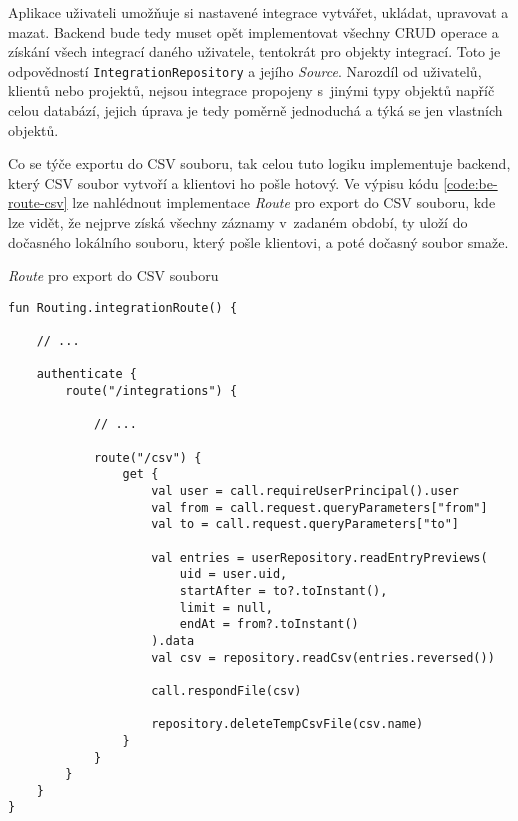 Aplikace uživateli umožňuje si nastavené integrace vytvářet, ukládat, upravovat a mazat. Backend bude tedy muset opět implementovat všechny CRUD operace a získání všech integrací daného uživatele, tentokrát pro objekty integrací. Toto je odpovědností \texttt{IntegrationRepository} a jejího \emph{Source}. Narozdíl od uživatelů, klientů nebo projektů, nejsou integrace propojeny s~jinými typy objektů napříč celou databází, jejich úprava je tedy poměrně jednoduchá a týká se jen vlastních objektů.

Co se týče exportu do CSV souboru, tak celou tuto logiku implementuje backend, který CSV soubor vytvoří a klientovi ho pošle hotový. Ve výpisu kódu \ref{code:be-route-csv} lze nahlédnout implementace \emph{Route} pro export do CSV souboru, kde lze vidět, že nejprve získá všechny záznamy v~zadaném období, ty uloží do dočasného lokálního souboru, který pošle klientovi, a poté dočasný soubor smaže.

\begin{listing}
\caption{\emph{Route} pro export do CSV souboru}\label{code:be-route-csv}
\begin{verbatim}
fun Routing.integrationRoute() {

    // ...
    
    authenticate {
        route("/integrations") {
        
            // ...
            
            route("/csv") {
                get {
                    val user = call.requireUserPrincipal().user
                    val from = call.request.queryParameters["from"]
                    val to = call.request.queryParameters["to"]

                    val entries = userRepository.readEntryPreviews(
                        uid = user.uid,
                        startAfter = to?.toInstant(),
                        limit = null,
                        endAt = from?.toInstant()
                    ).data
                    val csv = repository.readCsv(entries.reversed())

                    call.respondFile(csv)

                    repository.deleteTempCsvFile(csv.name)
                }
            }
        }
    }
}       
\end{verbatim}
\end{listing}

